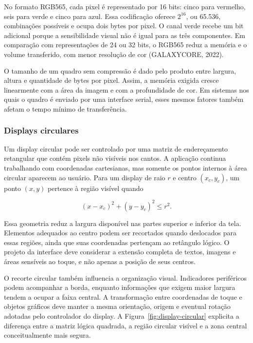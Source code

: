 \documentclass{article}
\begin{document}
No formato RGB565, cada pixel \'e representado por 16 bits: cinco para vermelho, seis para verde e cinco para azul. Essa codifica\c{c}\~ao oferece \(2^{16}\), ou 65.536, combina\c{c}\~oes poss\'iveis e ocupa dois bytes por pixel. O canal verde recebe um bit adicional porque a sensibilidade visual n\~ao \'e igual para as tr\^es componentes. Em compara\c{c}\~ao com representa\c{c}\~oes de 24 ou 32 bits, o RGB565 reduz a mem\'oria e o volume transferido, com menor resolu\c{c}\~ao de cor (GALAXYCORE, 2022).


O tamanho de um quadro sem compress\~ao \'e dado pelo produto entre largura, altura e quantidade de bytes por pixel. Assim, a mem\'oria exigida cresce linearmente com a \'area da imagem e com a profundidade de cor. Em sistemas nos quais o quadro \'e enviado por uma interface serial, esses mesmos fatores tamb\'em afetam o tempo m\'inimo de transfer\^encia.


\subsubsection{Displays circulares}


Um display circular pode ser controlado por uma matriz de endere\c{c}amento retangular que cont\'em pixels n\~ao vis\'iveis nos cantos. A aplica\c{c}\~ao continua trabalhando com coordenadas cartesianas, mas somente os pontos internos \`a \'area circular aparecem ao usu\'ario. Para um display de raio \(r\) e centro \((x_c,y_c)\), um ponto \((x,y)\) pertence \`a regi\~ao vis\'ivel quando


\[
(x-x_c)^2+(y-y_c)^2 \leq r^2.
\]


Essa geometria reduz a largura dispon\'ivel nas partes superior e inferior da tela. Elementos adequados ao centro podem ser recortados quando deslocados para essas regi\~oes, ainda que suas coordenadas perten\c{c}am ao ret\^angulo l\'ogico. O projeto da interface deve considerar a extens\~ao completa de textos, imagens e \'areas sens\'iveis ao toque, e n\~ao apenas a posi\c{c}\~ao de seus centros.


O recorte circular tamb\'em influencia a organiza\c{c}\~ao visual. Indicadores perif\'ericos podem acompanhar a borda, enquanto informa\c{c}\~oes que exigem maior largura tendem a ocupar a faixa central. A transforma\c{c}\~ao entre coordenadas de toque e objetos gr\'aficos deve manter a mesma orienta\c{c}\~ao, origem e eventual rota\c{c}\~ao adotadas pelo controlador do display. A Figura~\ref{fig:display-circular} explicita a diferen\c{c}a entre a matriz l\'ogica quadrada, a regi\~ao circular vis\'ivel e a zona central conceitualmente mais segura.
\end{document}
